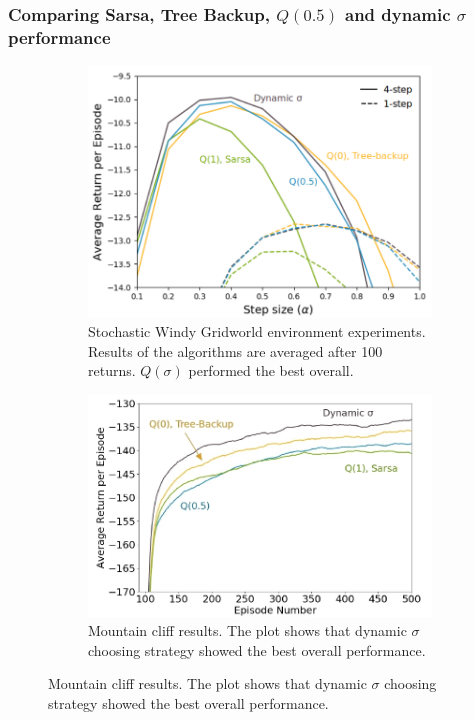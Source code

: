 \documentclass{beamer}
\begin{document}
\begin{frame}
  \frametitle{Comparing Sarsa, Tree Backup, $Q(0.5)$ and dynamic $\sigma$
    performance}
  \begin{figure}
  \centering
  \begin{minipage}{.48\textwidth}
    \centering
    \begin{figure}
      \includegraphics[width=\linewidth]{windy_gridworld_plot.png}
      \caption{Stochastic Windy Gridworld environment experiments. Results of
        the algorithms are averaged after 100 returns. $Q(\sigma)$ performed the
        best overall.}
    \end{figure}
  \end{minipage}
  \begin{minipage}{.48\textwidth}
    \centering
    \begin{figure}
      \includegraphics[width=\linewidth]{mountain_cliff_plot.png}
      \caption{Mountain cliff results. The plot shows that dynamic $\sigma$
        choosing strategy showed the best overall performance.}
    \end{figure}
  \end{minipage}
  \end{figure}
\end{frame}
\end{document}
